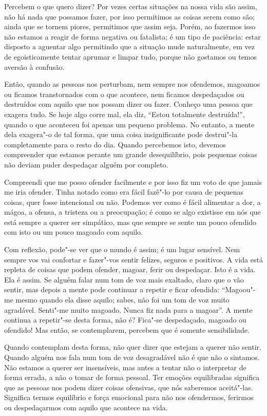 Percebem o que quero dizer? Por vezes certas situações na nossa vida são assim,
não há nada que possamos fazer, por isso permitimos as coisas serem como são;
ainda que se tornem piores, permitimos que assim seja. Porém, ao fazermos isso
não estamos a reagir de forma negativa ou fatalista; é um tipo de paciência:
estar disposto a aguentar algo permitindo que a situação mude naturalmente, em
vez de egoisticamente tentar aprumar e limpar tudo, porque não gostamos ou temos
aversão à confusão.

Então, quando as pessoas nos perturbam, nem sempre nos ofendemos, magoamos ou
ficamos transtornados com o que acontece, nem ficamos despedaçados ou destruídos
com aquilo que nos possam dizer ou fazer. Conheço uma pessoa que exagera tudo.
Se hoje algo corre mal, ela diz, “Estou totalmente destruída!”, quando o que
aconteceu foi apenas um pequeno problema. No entanto, a mente dela exagera"-o de
tal forma, que uma coisa insignificante pode destrui"-la completamente para o resto
do dia. Quando percebemos isto, devemos compreender que estamos perante um
grande desequilíbrio, pois pequenas coisas não deviam puder despedaçar alguém por
completo.

Compreendi que me posso ofender facilmente e por isso fiz um voto de que jamais
me iria ofender. Tinha notado como era fácil fazê"-lo por causa de pequenas
coisas, quer fosse intencional ou não. Podemos ver como é fácil alimentar a dor,
a mágoa, a ofensa, a tristeza ou a preocupação; é como se algo existisse em nós
que está sempre a querer ser simpático, mas que sempre se sente um pouco
ofendido com isto ou um pouco magoado com aquilo.

Com reflexão, pode"-se ver que o mundo é assim; é um lugar sensível. Nem sempre
vos vai confortar e fazer"-vos sentir felizes, seguros e positivos. A vida está
repleta de coisas que podem ofender, magoar, ferir ou despedaçar. Isto é a vida.
Ela é assim. Se alguém falar num tom de voz mais exaltado, claro que o vão
sentir, mas depois a mente pode continuar a repetir e ficar ofendida: “Magoou"-me
mesmo quando ela disse aquilo; sabes, não foi um tom de voz muito agradável.
Senti"-me muito magoado. Nunca fiz nada para a magoar”. A mente continua a
repetir"-se desta forma, não é? Fica"-se despedaçado, magoado ou ofendido! Mas
então, se contemplarem, percebem que é somente sensibilidade.

Quando contemplam desta forma, não quer dizer que estejam a querer não sentir.
Quando alguém nos fala num tom de voz desagradável não é que não o sintamos. Não
estamos a querer ser insensíveis, mas antes a tentar não o interpretar de forma
errada, a não o tomar de forma pessoal. Ter emoções equilibradas significa que
as pessoas nos podem dizer coisas ofensivas, que nós saberemos aceitá"-las. Significa termos
equilíbrio e força emocional para não nos ofendermos, ferirmos ou despedaçarmos
com aquilo que acontece na vida.

